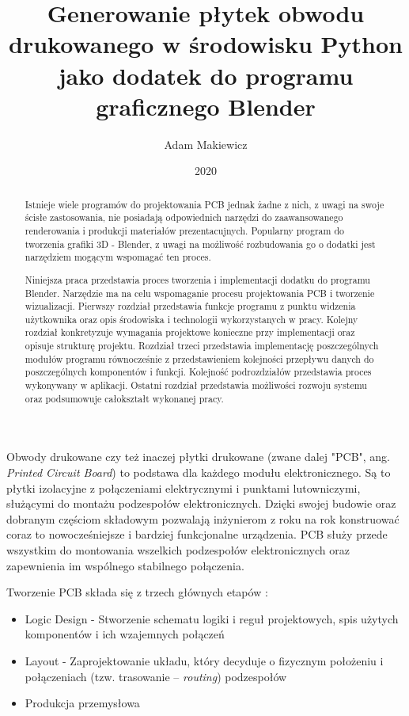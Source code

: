 \documentclass{xmgr}
\author   {Adam Makiewicz}
\title    {Generowanie płytek obwodu drukowanego w środowisku Python jako dodatek do programu graficznego Blender}
\date     {2020}
\begin{document}
\begin{abstract}
Istnieje wiele programów do projektowania PCB jednak żadne z nich, z uwagi na swoje ścisłe zastosowania, nie posiadają odpowiednich narzędzi do zaawansowanego renderowania i produkcji materiałów prezentacujnych. Popularny program do tworzenia grafiki 3D - Blender, z uwagi na możliwość rozbudowania go o dodatki jest narzędziem mogącym wspomagać ten proces.

Niniejsza praca przedstawia proces tworzenia i implementacji dodatku do programu Blender. Narzędzie ma na celu wspomaganie procesu projektowania PCB i tworzenie wizualizacji. Pierwszy rozdział przedstawia funkcje programu z punktu widzenia użytkownika oraz opis środowiska i technologii wykorzystanych w pracy.
Kolejny rozdział konkretyzuje wymagania projektowe konieczne przy implementacji oraz opisuje strukturę projektu.
Rozdział trzeci przedstawia implementację poszczególnych modułów programu równocześnie z przedstawieniem kolejności przepływu danych do poszczególnych komponentów i funkcji. Kolejność podrozdziałów przedstawia proces wykonywany w aplikacji. Ostatni rozdział przedstawia możliwości rozwoju systemu oraz podsumowuje całokształt wykonanej pracy. 

\end{abstract}



\maketitle

\introduction

Obwody drukowane czy też inaczej płytki drukowane (zwane dalej "PCB", ang. \emph{Printed Circuit Board}) to podstawa dla każdego modułu elektronicznego. Są to płytki izolacyjne z połączeniami elektrycznymi i punktami lutowniczymi, służącymi do montażu podzespołów elektronicznych. Dzięki swojej budowie oraz dobranym częściom składowym pozwalają inżynierom z roku na rok konstruować coraz to nowocześniejsze i bardziej funkcjonalne urządzenia. PCB służy przede wszystkim do montowania wszelkich podzespołów elektronicznych oraz zapewnienia im wspólnego stabilnego połączenia.

\vspace{5mm}
Tworzenie PCB składa się z trzech głównych etapów \cite{Abboud}:

\begin{itemize}
\item
Logic Design - Stworzenie schematu logiki i reguł projektowych, spis użytych komponentów i ich wzajemnych połączeń
\item
Layout - Zaprojektowanie układu, który decyduje o fizycznym położeniu i połączeniach (tzw. trasowanie -- \emph{routing}) podzespołów
\item
Produkcja przemysłowa
\end{itemize}
    
\end{document}
